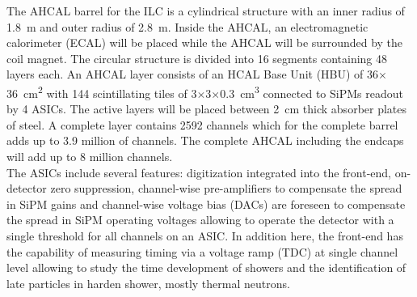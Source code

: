 The AHCAL barrel for the ILC is a cylindrical structure with an inner radius of \SI{1.8}{\metre} and outer radius of \SI{2.8}{\metre}.
Inside the AHCAL, an electromagnetic calorimeter (ECAL) will be placed while the AHCAL will be surrounded by the coil magnet. The circular structure is divided into 16 segments containing 48 layers each. An AHCAL layer consists of an HCAL Base Unit (HBU) of 36$\times$\SI{36}{\square\centi\metre} with 144 scintillating tiles of 3$\times$3$\times$\SI{0.3}{\cubic\centi\metre} connected to SiPMs readout by 4 ASICs. The active layers will be placed between \SI{2}{\centi\metre} thick absorber plates of steel. A complete layer contains 2592 channels which for the complete barrel adds up to 3.9 million of channels. The complete AHCAL including the endcaps will add up to 8 million channels.\\

The ASICs include several features: digitization integrated into the front-end, on-detector zero suppression, channel-wise pre-amplifiers to compensate the spread in SiPM gains and channel-wise voltage bias (DACs) are foreseen to compensate the spread in SiPM operating voltages allowing to operate the detector with a single threshold for all channels on an ASIC. In addition here, the front-end has the capability of measuring timing via a voltage ramp (TDC) at single channel level allowing to study the time development of showers and the identification of late particles in harden shower, mostly thermal neutrons.\\

